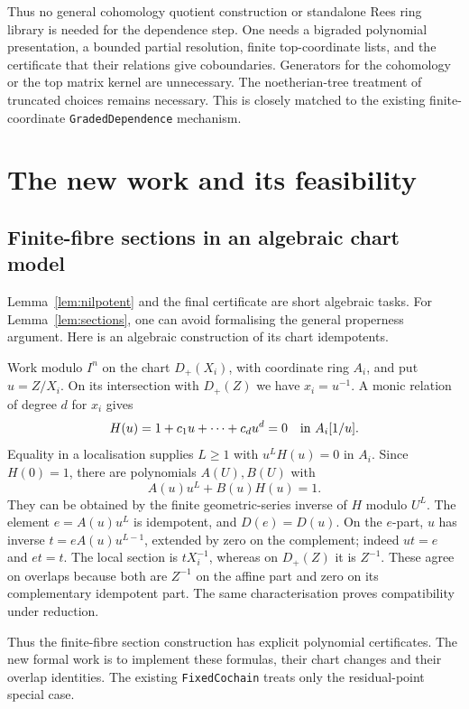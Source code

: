 \documentclass[11pt]{amsart}
\theoremstyle{definition}
\theoremstyle{remark}
\newcommand{\code}[1]{\texttt{#1}}
\begin{document}
Thus no general cohomology quotient construction or standalone Rees
ring library is needed for the dependence step. One needs a
bigraded polynomial presentation, a bounded partial resolution,
finite top-coordinate lists, and the certificate that their relations
give coboundaries. Generators for the cohomology or the top matrix
kernel are unnecessary.
The noetherian-tree treatment of truncated choices remains necessary.
This is closely matched to the existing finite-coordinate
\code{GradedDependence} mechanism.

\section{The new work and its feasibility}

\subsection{Finite-fibre sections in an algebraic chart model}
Lemma~\ref{lem:nilpotent} and the final certificate are short algebraic
tasks. For Lemma~\ref{lem:sections}, one can avoid formalising the
general properness argument. Here is an algebraic construction of its
chart idempotents.

Work modulo $I^n$ on the chart $D_+(X_i)$, with coordinate ring $A_i$,
and put $u=Z/X_i$. On its intersection with $D_+(Z)$ we have
$x_i=u^{-1}$. A monic relation of degree $d$ for $x_i$ gives
\[
 H(u)=1+c_1u+\cdots+c_du^d=0\quad\hbox{in }A_i[1/u].
\]
Equality in a localisation supplies $L\geq1$ with $u^LH(u)=0$ in
$A_i$. Since $H(0)=1$, there are polynomials $A(U),B(U)$ with
\[
 A(u)u^L+B(u)H(u)=1.
\]
They can be obtained by the finite geometric-series inverse of $H$
modulo $U^L$. The element $e=A(u)u^L$ is idempotent, and
$D(e)=D(u)$. On the $e$-part, $u$ has inverse
$t=eA(u)u^{L-1}$, extended by zero on the complement; indeed
$ut=e$ and $et=t$. The local section is $tX_i^{-1}$, whereas on
$D_+(Z)$ it is $Z^{-1}$. These agree on overlaps because both are
$Z^{-1}$ on the affine part and zero on its complementary idempotent
part. The same characterisation proves compatibility under reduction.

Thus the finite-fibre section construction has explicit polynomial
certificates. The new formal work is to implement these formulas,
their chart changes and their overlap identities. The existing
\code{FixedCochain} treats only the residual-point special case.
\end{document}
